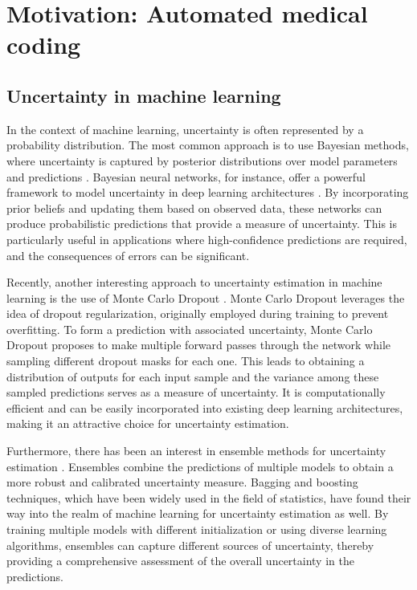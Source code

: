 \section{Motivation: Automated medical coding}


\subsection{Uncertainty in machine learning}


In the context of machine learning, uncertainty is often represented by a probability distribution. The most common approach is to use Bayesian methods, where uncertainty is captured by posterior distributions over model parameters and predictions \cite{gelman_bayesian_2013}. Bayesian neural networks, for instance, offer a powerful framework to model uncertainty in deep learning architectures \cite{neal_bayesian_1995}. By incorporating prior beliefs and updating them based on observed data, these networks can produce probabilistic predictions that provide a measure of uncertainty. This is particularly useful in applications where high-confidence predictions are required, and the consequences of errors can be significant.

Recently, another interesting approach to uncertainty estimation in machine learning is the use of Monte Carlo Dropout \cite{gal_dropout_2016}. Monte Carlo Dropout leverages the idea of dropout regularization, originally employed during training to prevent overfitting. To form a prediction with associated uncertainty, Monte Carlo Dropout proposes to make multiple forward passes through the network while sampling different dropout masks for each one. This leads to obtaining a distribution of outputs for each input sample and the variance among these sampled predictions serves as a measure of uncertainty. It is computationally efficient and can be easily incorporated into existing deep learning architectures, making it an attractive choice for uncertainty estimation.

Furthermore, there has been an interest in ensemble methods for uncertainty estimation \cite{lakshminarayanan_simple_2017}. Ensembles combine the predictions of multiple models to obtain a more robust and calibrated uncertainty measure. Bagging and boosting techniques, which have been widely used in the field of statistics, have found their way into the realm of machine learning for uncertainty estimation as well. By training multiple models with different initialization or using diverse learning algorithms, ensembles can capture different sources of uncertainty, thereby providing a comprehensive assessment of the overall uncertainty in the predictions.

